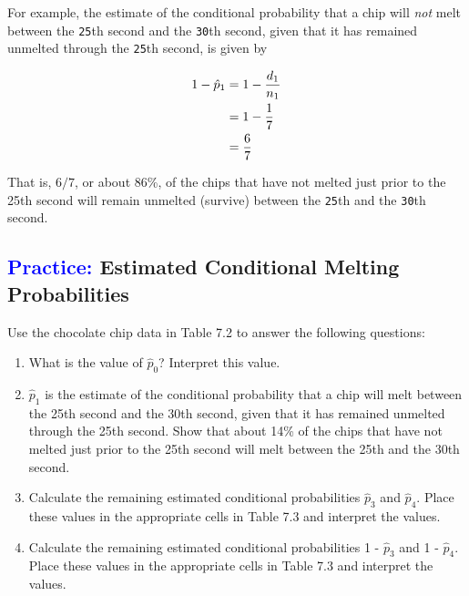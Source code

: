 \documentclass[
]{report}
\begin{document}
For example, the estimate of the conditional probability that a chip will \emph{not} melt between the \texttt{25}th second and the \texttt{30}th second, given that it has remained unmelted through the \texttt{25}th second, is given by

\begin{align}
1 - \hat p_1 &= 1 - \frac{d_1}{n_1} \notag \\
&= 1 - \frac{1}{7} \notag \\
&= \frac{6}{7} \notag
\end{align}

That is, \(\scriptstyle 6/7\), or about 86\%, of the chips that have not melted just prior to the 25th second will remain unmelted (survive) between the \texttt{25}th and the \texttt{30}th second.

\hypertarget{estimated-conditional-melting-probabilities}{%
\subsection*{\texorpdfstring{\textcolor{blue}{Practice:} Estimated Conditional Melting Probabilities}{ Estimated Conditional Melting Probabilities}}\label{estimated-conditional-melting-probabilities}}

Use the chocolate chip data in Table 7.2 to answer the following questions:

\begin{enumerate}
\def\labelenumi{\arabic{enumi}.}
\setcounter{enumi}{8}
\item
  What is the value of \(\scriptstyle \hat p_0\)? Interpret this value.
\item
  \(\scriptstyle \hat p_1\) is the estimate of the conditional probability that a chip will melt between the 25th second and the 30th second, given that it has remained unmelted through the 25th second. Show that about 14\% of the chips that have not melted just prior to the 25th second will melt between the 25th and the 30th second.
\item
  Calculate the remaining estimated conditional probabilities \(\scriptstyle \hat p_3\) and \(\scriptstyle \hat p_4\). Place these values in the appropriate cells in Table 7.3 and interpret the values.\\
\item
  Calculate the remaining estimated conditional probabilities 1 - \(\scriptstyle \hat p_3\) and 1 - \(\scriptstyle \hat p_4\). Place these values in the appropriate cells in Table 7.3 and interpret the values.
\end{enumerate}
\end{document}
